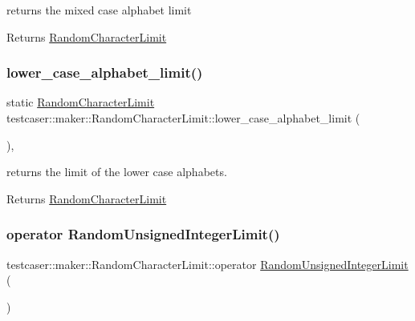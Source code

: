 returns the mixed case alphabet limit 

\begin{DoxyReturn}{Returns}
\hyperlink{classtestcaser_1_1maker_1_1RandomCharacterLimit}{Random\+Character\+Limit} 
\end{DoxyReturn}
\mbox{\label{classtestcaser_1_1maker_1_1RandomCharacterLimit_ae6e40c00b9225a88b0133c17d4b24f90}} 
\subsubsection{\texorpdfstring{lower\+\_\+case\+\_\+alphabet\+\_\+limit()}{lower\_case\_alphabet\_limit()}}
{\footnotesize\ttfamily static \hyperlink{classtestcaser_1_1maker_1_1RandomCharacterLimit}{Random\+Character\+Limit} testcaser\+::maker\+::\+Random\+Character\+Limit\+::lower\+\_\+case\+\_\+alphabet\+\_\+limit (\begin{DoxyParamCaption}{ }\end{DoxyParamCaption})\hspace{0.3cm}{\ttfamily [inline]}, {\ttfamily [static]}}



returns the limit of the lower case alphabets. 

\begin{DoxyReturn}{Returns}
\hyperlink{classtestcaser_1_1maker_1_1RandomCharacterLimit}{Random\+Character\+Limit} 
\end{DoxyReturn}
\mbox{\label{classtestcaser_1_1maker_1_1RandomCharacterLimit_a230a33b5d028fdef4a027f7c96663d32}} 
\subsubsection{\texorpdfstring{operator Random\+Unsigned\+Integer\+Limit()}{operator RandomUnsignedIntegerLimit()}}
{\footnotesize\ttfamily testcaser\+::maker\+::\+Random\+Character\+Limit\+::operator \hyperlink{classtestcaser_1_1maker_1_1RandomUnsignedIntegerLimit}{Random\+Unsigned\+Integer\+Limit} (\begin{DoxyParamCaption}{ }\end{DoxyParamCaption})\hspace{0.3cm}{\ttfamily [inline]}}



